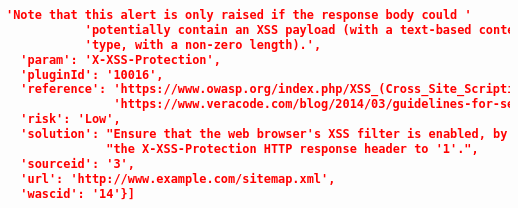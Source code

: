 \begin{lstlisting}[language=json,label={lst:owas_zap_welcome_message_alerts},caption={Alerts showed with NGINX default configuration}]
           'Note that this alert is only raised if the response body could '
           'potentially contain an XSS payload (with a text-based content '
           'type, with a non-zero length).',
  'param': 'X-XSS-Protection',
  'pluginId': '10016',
  'reference': 'https://www.owasp.org/index.php/XSS_(Cross_Site_Scripting)_Prevention_Cheat_Sheet\n'
               'https://www.veracode.com/blog/2014/03/guidelines-for-setting-security-headers/',
  'risk': 'Low',
  'solution': "Ensure that the web browser's XSS filter is enabled, by setting "
              "the X-XSS-Protection HTTP response header to '1'.",
  'sourceid': '3',
  'url': 'http://www.example.com/sitemap.xml',
  'wascid': '14'}]
\end{lstlisting}